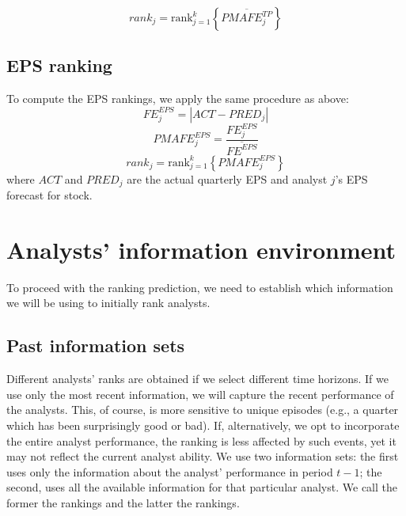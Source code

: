 \documentclass[12pt,a4paper]{article}\usepackage[]{graphicx}\usepackage[]{color}
\begin{document}
\begin{equation}
	\label{ch4-tp:rank}
	rank_{j}=\mathrm{rank}_{j=1}^{k} \left\{ \overline{PMAFE_{j}^{TP}} \right\}
\end{equation}


\subsection{EPS ranking}
\label{ch4:sec-eps}
To compute the EPS rankings, we apply the same procedure as above:
\begin{equation}
	FE_{j}^{EPS}=|{ACT-PRED_{j}}|
\end{equation}
\begin{equation}
	PMAFE_{j}^{EPS}= \frac{FE_{j}^{EPS}}{\overline{FE^{EPS}}}
\end{equation}
\begin{equation}
	\label{ch4-eps:rank}
	rank_{j}=\mathrm{rank}_{j=1}^{k} \left\{ PMAFE_{j}^{EPS} \right\}
\end{equation}
where $ACT$ and $PRED_{j}$ are the actual quarterly EPS and  analyst $j$'s EPS forecast for stock.




\section{Analysts' information environment}
\label{ch4:inf-set}
To proceed with the ranking prediction, we need to establish which information we  will be using to initially rank analysts. 

\subsection{Past information sets}
Different analysts' ranks are obtained  if we select different time horizons. If we use only the most  recent information, we will capture the recent performance of the analysts. This, of course, is more sensitive to unique episodes (e.g., a quarter which has been surprisingly good or bad). If, alternatively, we opt to incorporate the entire analyst performance, the ranking is less affected by such events, yet it may not reflect the current analyst ability. We use two information sets: the first uses only the  information about the analyst' performance in period $t-1$; the second, uses all the available  information for that particular analyst. We call the former the \naive{} rankings and the latter the  rankings.
\end{document}
